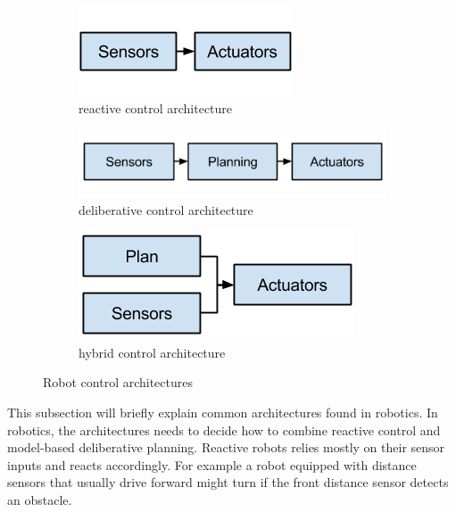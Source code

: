 \begin{figure}[H]
    \centering
    \begin{subfigure}[b]{0.25\textwidth}
        \centering
        \includegraphics[width=\textwidth]{figs/reactive}
        \caption{reactive control architecture}
        \label{fig:reactive}
    \end{subfigure}
    \hfill
    \begin{subfigure}[b]{0.4\textwidth}
        \centering
        \includegraphics[width=\textwidth]{figs/deliberative}
        \caption{deliberative control architecture}
        \label{fig:deliberative}
    \end{subfigure}
    \hfill
    \begin{subfigure}[b]{0.3\textwidth}
        \centering
        \includegraphics[width=\textwidth]{figs/hybrid}
        \caption{hybrid control architecture}
        \label{fig:hybrid}
    \end{subfigure}
    \caption[Robot architecture]{Robot control architectures}
    \label{fig:robotArchitectures}
\end{figure}

This subsection will briefly explain common architectures found in robotics. In robotics, the architectures needs to decide how to combine reactive control and model-based deliberative planning. Reactive robots relies mostly on their sensor inputs and reacts accordingly. For example a robot equipped with distance sensors that usually drive forward might turn if the front distance sensor detects an obstacle.

